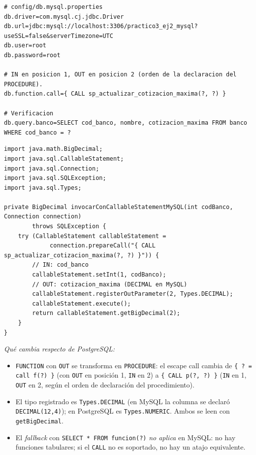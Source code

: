 \documentclass[11pt,a4paper]{article}
\begin{document}
\begin{lstlisting}[style=propsstyle]
# config/db.mysql.properties
db.driver=com.mysql.cj.jdbc.Driver
db.url=jdbc:mysql://localhost:3306/practico3_ej2_mysql?useSSL=false&serverTimezone=UTC
db.user=root
db.password=root

# IN en posicion 1, OUT en posicion 2 (orden de la declaracion del PROCEDURE).
db.function.call={ CALL sp_actualizar_cotizacion_maxima(?, ?) }

# Verificacion
db.query.banco=SELECT cod_banco, nombre, cotizacion_maxima FROM banco WHERE cod_banco = ?
\end{lstlisting}

\begin{lstlisting}
import java.math.BigDecimal;
import java.sql.CallableStatement;
import java.sql.Connection;
import java.sql.SQLException;
import java.sql.Types;

private BigDecimal invocarConCallableStatementMySQL(int codBanco, Connection connection)
        throws SQLException {
    try (CallableStatement callableStatement =
             connection.prepareCall("{ CALL sp_actualizar_cotizacion_maxima(?, ?) }")) {
        // IN: cod_banco
        callableStatement.setInt(1, codBanco);
        // OUT: cotizacion_maxima (DECIMAL en MySQL)
        callableStatement.registerOutParameter(2, Types.DECIMAL);
        callableStatement.execute();
        return callableStatement.getBigDecimal(2);
    }
}
\end{lstlisting}

\textit{Qué cambia respecto de PostgreSQL:}

\begin{itemize}
    \item \texttt{FUNCTION} con \texttt{OUT} se transforma en \texttt{PROCEDURE}: el escape call cambia de \texttt{\{ ? = call f(?) \}} (con \texttt{OUT} en posición 1, \texttt{IN} en 2) a \texttt{\{ CALL p(?, ?) \}} (\texttt{IN} en 1, \texttt{OUT} en 2, según el orden de declaración del procedimiento).
    \item El tipo registrado es \texttt{Types.DECIMAL} (en MySQL la columna se declaró \texttt{DECIMAL(12,4)}); en PostgreSQL es \texttt{Types.NUMERIC}. Ambos se leen con \texttt{getBigDecimal}.
    \item El \emph{fallback} con \texttt{SELECT * FROM funcion(?)} \emph{no aplica} en MySQL: no hay funciones tabulares; si el \texttt{CALL} no es soportado, no hay un atajo equivalente.
\end{itemize}
\end{document}
